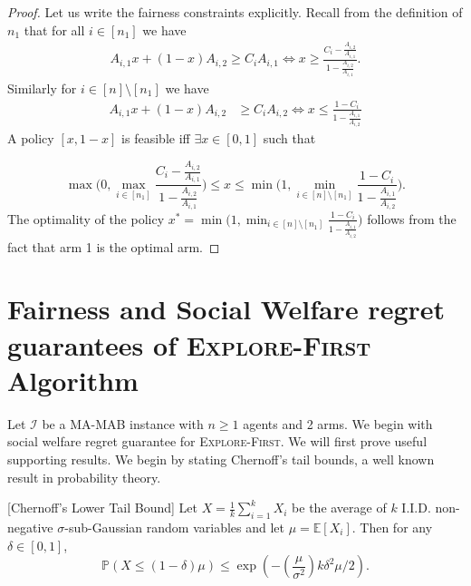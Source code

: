\propOne*

\begin{proof}
Let us write the fairness constraints explicitly. Recall from the definition of $n_1$ that 
 for all $i \in [n_1]$  we have 
\begin{align*}
A_{i,1}x + (1-x) A_{i,2} \geq C_i    A_{i,1}   
\iff   x \geq \frac{C_i - \frac{A_{i,2}}{A_{i,1}}}{ 1 - \frac{A_{i,2}}{A_{i,1}}}. 
\end{align*}
Similarly for $i \in [n] \setminus [n_1]$ we have 
\begin{align*}
A_{i,1}x + (1-x) A_{i,2} & \geq C_i    A_{i,2}  
\iff   x  \leq \frac{1 - C_i}{ 1 - \frac{A_{i,1}}{A_{i,2}}}
\end{align*}
A policy $[x, 1-x]$ is feasible iff $\exists x \in [0,1]$ such that $ $ 

$$ \max \Bigg( 0,  \max_{i \in [n_1]}\frac{C_i - \frac{A_{i,2}}{A_{i,1}}}{ 1 - \frac{A_{i,2}}{A_{i,1}}} \Bigg) \leq x \leq \min \Bigg( 1,  \min_{i \in [n] \setminus [n_1]}\frac{1 - C_i}{ 1 - \frac{A_{i,1}}{A_{i,2}}} \Bigg). $$  The optimality of the policy $x^* = \min \Bigg( 1,  \min_{i \in [n] \setminus [n_1]}\frac{1 - C_i}{ 1 - \frac{A_{i,1}}{A_{i,2}}} \Bigg)$ follows from the fact that arm 1 is the optimal arm.  
\end{proof}

\section{Fairness and Social Welfare regret guarantees of \textsc{Explore-First} Algorithm}

Let $\mathcal{I}$ be a MA-MAB instance with $n \geq 1 $ agents and 2 arms. We begin with social welfare regret guarantee for \textsc{Explore-First}. We will first prove useful supporting results. We begin by stating  Chernoff's tail bounds, a well known result in probability theory. 

\begin{lemma}\label{lemma:chernoff-ltb}
[Chernoff's Lower Tail Bound] Let $X = \frac{1}{k}\sum_{i=1}^k X_i$ be the average of $k$ I.I.D. non-negative $\sigma$-sub-Gaussian random variables and let $ \mu=\mathbb{E}[X_i]$. Then for any $\delta\in [0, 1]$,
$$\mathbb{P}(X\leq (1-\delta) \mu)\leq \exp{\left(-\left(\frac{ \mu}{\sigma^2}\right)k\delta^2 \mu/2\right)}.$$
\end{lemma}

